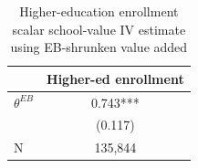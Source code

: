 \begin{table}[!htbp]
\centering
\caption{Higher-education enrollment scalar school-value IV estimate using EB-shrunken value added}
\label{tab:scalar_school_value_iv_higher_ed_enrollment_expected_va_eb}
\begin{tabular}{lc}
\toprule
 & Higher-ed enrollment \\
\midrule
$\theta^{EB}$ & 0.743*** \\
 & (0.117) \\
N & 135,844 \\
\bottomrule
\end{tabular}
\end{table}
